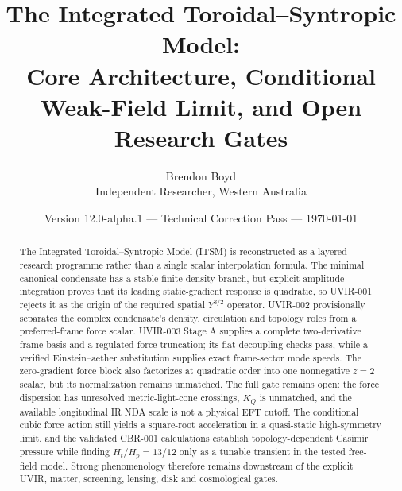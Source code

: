\documentclass[11pt]{article}
\title{The Integrated Toroidal--Syntropic Model:\\
Core Architecture, Conditional Weak-Field Limit, and Open Research Gates}
\author{Brendon Boyd\\Independent Researcher, Western Australia}
\date{Version 12.0-alpha.1 --- Technical Correction Pass --- \today}
\begin{document}
\maketitle

\begin{center}
\end{center}

\begin{abstract}
The Integrated Toroidal--Syntropic Model (ITSM) is reconstructed as a layered
research programme rather than a single scalar interpolation formula.  The
minimal canonical condensate has a stable finite-density branch, but explicit
amplitude integration proves that its leading static-gradient response is
quadratic, so UVIR-001 rejects it as the origin of the required spatial
$Y^{3/2}$ operator.  UVIR-002 provisionally separates the complex condensate's
density, circulation and topology roles from a preferred-frame force scalar.
UVIR-003 Stage A supplies a complete two-derivative frame basis and a regulated
force truncation; its flat decoupling checks pass, while a verified
Einstein--aether substitution supplies exact frame-sector mode speeds.  The
zero-gradient force block also factorizes at quadratic order into one
nonnegative $z=2$ scalar, but its normalization remains unmatched.  The
full gate remains open: the force dispersion has unresolved metric-light-cone
crossings, $K_Q$ is unmatched, and the available longitudinal IR NDA scale is
not a physical EFT cutoff.  The conditional cubic force action still yields a
square-root acceleration in a quasi-static high-symmetry limit, and the
validated CBR-001 calculations establish topology-dependent Casimir pressure
while finding $H_t/H_p=13/12$ only as a tunable transient in the tested
free-field model.  Strong phenomenology therefore remains downstream of the
explicit UVIR, matter, screening, lensing, disk and cosmological gates.
\end{abstract}

\tableofcontents











\end{document}
